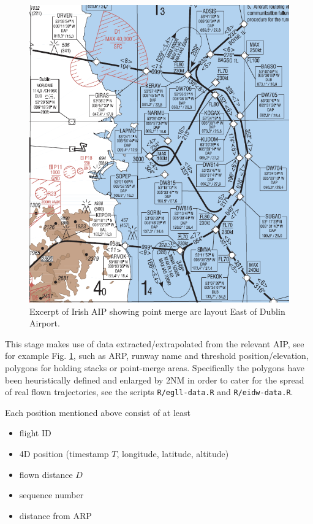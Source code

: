 \documentclass[conference,final,a4paper,]{IEEEtran}
\providecommand{\tightlist}{%
  \setlength{\itemsep}{0pt}\setlength{\parskip}{0pt}}
\begin{document}
\begin{figure}[hbt]

{\centering \includegraphics[width=1\linewidth]{figures/eidw-arrival-chart-east} 

}

\caption{Excerpt of Irish AIP showing point merge
arc layout East of Dublin Airport.}\label{fig:eidw-arrival-chart-east}
\end{figure}

This stage makes use of data extracted/extrapolated from the relevant
AIP, see for example Fig. \ref{fig:eidw-arrival-chart-east}, such as
ARP, runway name and threshold position/elevation, polygons for holding
stacks or point-merge areas. Specifically the polygons have been
heuristically defined and enlarged by 2NM in order to cater for the
spread of real flown trajectories, see the scripts
\texttt{R/egll-data.R} and \texttt{R/eidw-data.R}.

Each position mentioned above consist of at least

\begin{itemize}
\tightlist
\item
  flight ID
\item
  4D position (timestamp \(T\), longitude, latitude, altitude)
\item
  flown distance \(D\)
\item
  sequence number
\item
  distance from ARP
\end{itemize}
\end{document}
